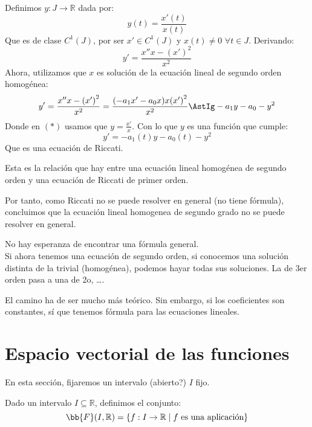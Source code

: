Definimos $y:J\rightarrow\mathbb{R}$ dada por:
\begin{equation*}
    y(t) = \dfrac{x'(t)}{x(t)}
\end{equation*}
Que es de clase $C^1(J)$, por ser $x'\in C^1(J)$ y $x(t) \neq 0$ $\forall t\in J$. Derivando:
\begin{equation*}
    y' = \dfrac{x'' x - {(x')}^{2}}{x^2}
\end{equation*}
Ahora, utilizamos que $x$ es solución de la ecuación lineal de segundo orden homogénea:
\begin{equation*}
    y' = \dfrac{x'' x - {(x')}^{2}}{x^2} = \dfrac{(-a_1x' - a_0 x)x {(x')}^{2}}{x^2} \AstIg -a_1 y - a_0 -y^2
\end{equation*}
Donde en $(\ast)$ usamos que $y = \frac{x'}{x}$. Con lo que $y$ es una función que cumple:
\begin{equation*}
    y' = -a_1(t)y - a_0(t) - y^2
\end{equation*}
Que es una ecuación de Riccati.

Esta es la relación que hay entre una ecuación lineal homogénea de segundo orden y una ecuación de Riccati de primer orden.


Por tanto, como Riccati no se puede resolver en general (no tiene fórmula), concluimos que la ecuación lineal homogenea de segundo grado no se puede resolver en general.

No hay esperanza de encontrar una fórmula general.\\


Si ahora tenemos una ecuación de segundo orden, si conocemos una solución distinta de la trivial (homogénea), podemos hayar todas sus soluciones.
La de 3er orden pasa a una de 2o, \ldots.

El camino ha de ser mucho más teórico.
Sin embargo, si los coeficientes son constantes, sí que tenemos fórmula para las ecuaciones lineales.


\section{Espacio vectorial de las funciones}


En esta sección, fijaremos un intervalo (abierto?) $I$ fijo.

\begin{definicion}
    Dado un intervalo $I\subseteq \mathbb{R}$, definimos el conjunto:
    \begin{equation*}
        \bb{F}(I,\mathbb{R}) = \{f:I\rightarrow\mathbb{R} \mid f \text{\ es una aplicación}\}
    \end{equation*}
\end{definicion}

